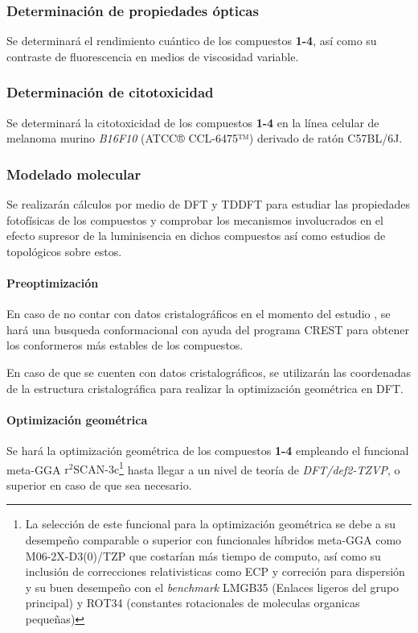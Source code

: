 \documentclass[spanish,mexico]{scrartcl}
\newcommand\scan{\(\text{r}^{2}\text{SCAN-3c}\)}
\begin{document}
\subsubsection{Determinación de propiedades ópticas}
Se determinará el rendimiento cuántico de los compuestos \textbf{1-4}, así como su contraste de fluorescencia en medios de viscosidad variable.

\subsubsection{Determinación de citotoxicidad}
Se determinará la citotoxicidad de los compuestos \textbf{1-4} en la línea celular de melanoma murino \emph{B16F10} (ATCC® CCL-6475™) derivado de ratón C57BL/6J.

\subsubsection{Modelado molecular}
Se realizarán cálculos \insilico{} por medio de \gls{DFT} y \gls{TDDFT} para estudiar las propiedades fotofísicas de los compuestos y comprobar los mecanismos involucrados en el efecto supresor de la luminisencia en dichos compuestos así como estudios de topológicos sobre estos.

\paragraph{Preoptimización}
En caso de no contar con datos cristalográficos en el momento del estudio \insilico{}, se hará una busqueda conformacional con ayuda del programa \gls{CREST} \cite{prachtAutomatedExplorationLowenergy2020} para obtener los conformeros más estables de los compuestos.

En caso de que se cuenten con datos cristalográficos, se utilizarán las coordenadas de la estructura cristalográfica para realizar la optimización geométrica en DFT.

\paragraph{Optimización geométrica}
Se hará la optimización geométrica de los compuestos \textbf{1-4} empleando el funcional meta-GGA \scan{}\footnote{La selección de este funcional para la optimización geométrica se debe a su desempeño comparable o superior con funcionales híbridos meta-GGA como M06-2X-D3(0)/TZP que costarían más tiempo de computo, así como su inclusión de correcciones relativisticas como ECP y correción para dispersión y su buen desempeño con el \emph{benchmark} LMGB35 (Enlaces ligeros del grupo principal) y ROT34 (constantes rotacionales de moleculas organicas pequeñas)} \cite{gasevicOptimizationSCAN3cComposite2022} hasta llegar a un nivel de teoría de \emph{DFT/def2-TZVP}, o superior en caso de que sea necesario.
\end{document}

